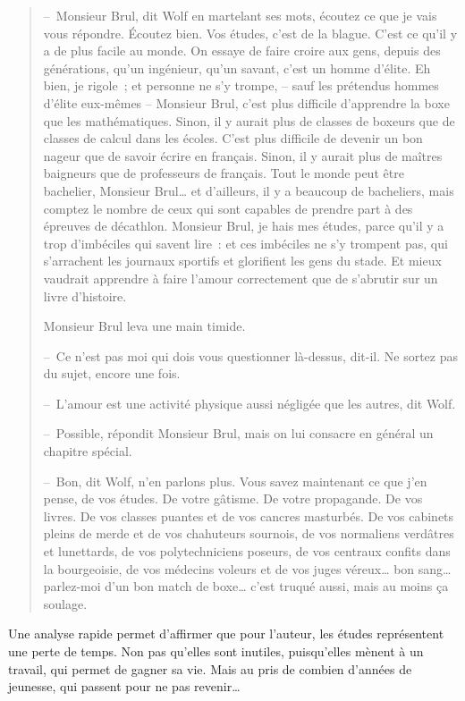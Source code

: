 {\small
\begin{quotation}
– Monsieur Brul, dit Wolf en martelant ses mots, écoutez ce que je vais vous répondre.
Écoutez bien. Vos études, c’est de la blague. C’est ce qu’il y a de plus facile au monde.
On essaye de faire croire aux gens, depuis des générations, qu’un ingénieur, qu’un savant,
c’est un homme d’élite. Eh bien, je rigole ; et personne ne s’y trompe, – sauf les
prétendus hommes d’élite eux-mêmes – Monsieur Brul, c’est plus difficile d’apprendre la
boxe que les mathématiques. Sinon, il y aurait plus de classes de boxeurs que de classes
de calcul dans les écoles. C’est plus difficile de devenir un bon nageur que de savoir
écrire en français. Sinon, il y aurait plus de maîtres baigneurs que de professeurs de
français. Tout le monde peut être bachelier, Monsieur Brul… et d’ailleurs, il y a beaucoup
de bacheliers, mais comptez le nombre de ceux qui sont capables de prendre part à des
épreuves de décathlon. Monsieur Brul, je hais mes études, parce qu’il y a trop
d’imbéciles qui savent lire : et ces imbéciles ne s’y trompent pas, qui s’arrachent
les journaux sportifs et glorifient les gens du stade. Et mieux vaudrait apprendre à
faire l’amour correctement que de s’abrutir sur un livre d’histoire.

Monsieur Brul leva une main timide.

– Ce n’est pas moi qui dois vous questionner là-dessus, dit-il. Ne sortez pas du sujet, encore une fois.

– L’amour est une activité physique aussi négligée que les autres, dit Wolf.

– Possible, répondit Monsieur Brul, mais on lui consacre en général un chapitre spécial.

– Bon, dit Wolf, n’en parlons plus. Vous savez maintenant ce que j’en pense, de vos études.
De votre gâtisme. De votre propagande. De vos livres. De vos classes puantes et de vos cancres
masturbés. De vos cabinets pleins de merde et de vos chahuteurs sournois, de vos normaliens
verdâtres et lunettards, de vos polytechniciens poseurs, de vos centraux confits dans la
bourgeoisie, de vos médecins voleurs et de vos juges véreux… bon sang… parlez-moi d’un bon
match de boxe… c’est truqué aussi, mais au moins ça soulage.
\end{quotation}
}

Une analyse rapide permet d'affirmer que pour l'auteur, les études représentent
une perte de temps. Non pas qu'elles sont inutiles, puisqu'elles mènent à un
travail, qui permet de gagner sa vie. Mais au pris de combien d'années de jeunesse,
qui passent pour ne pas revenir\ldots

